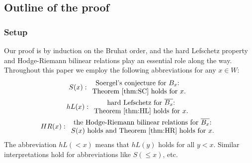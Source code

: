 \documentclass[11pt]{amsart}
\numberwithin{equation}{section}
\def\ov{\overline}
\theoremstyle{definition}
\theoremstyle{remark}
\begin{document}
\subsection{Outline of the proof} \label{sec:outline}

\subsubsection{Setup}
Our proof is by induction on the Bruhat order, and the hard Lefschetz
property and Hodge-Riemann bilinear relations play an essential role
along the way. Throughout this paper we employ the following
abbreviations for any $x \in W$:
\begin{gather*} S(x) : \begin{array}{c}
\text{Soergel's conjecture for $B_x$: }\\
\text{Theorem \ref{thm:SC} holds for $x$.}\end{array} \\
hL(x): \begin{array}{c} \text{hard Lefschetz for
      $\ov{B_x}$:}\\
\text{Theorem \ref{thm:HL} holds for $x$.} \end{array} \\
HR(x): \begin{array}{c} \text{the Hodge-Riemann bilinear
      relations for $\ov{B_x}$:}\\\text{$S(x)$ holds and Theorem \ref{thm:HR}
      holds for $x$.} \end{array}\end{gather*}
The abbreviation $hL(<\!x)$
means that $hL(y)$ holds for all $y < x$. Similar interpretations hold
for abbreviations like $S(\le\!x)$, etc.
\end{document}
